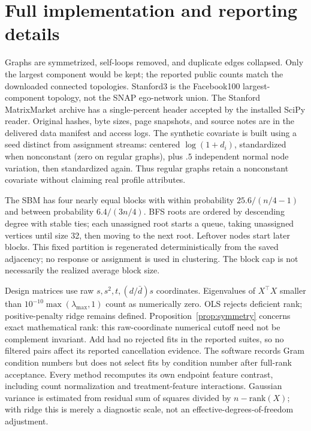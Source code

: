 \documentclass{article}
\begin{document}
\section{Full implementation and reporting details}\label{app:protocol}
\begin{table}[h]
\centering\small
\caption{Main graph statistics for seed 11 (synthetic) or the fixed public graph. Full per-seed manifests are delivered. Blocks are capped at 32 but may be smaller; edge cut is the fraction of edges crossing the partition.}\label{tab:graphs}

\end{table}

Graphs are symmetrized, self-loops removed, and duplicate edges collapsed. Only the largest component would be kept; the reported public counts match the downloaded connected topologies. Stanford3 is the Facebook100 largest-component topology, not the SNAP ego-network union. The Stanford MatrixMarket archive has a single-percent header accepted by the installed SciPy reader. Original hashes, byte sizes, page snapshots, and source notes are in the delivered data manifest and access logs. The synthetic covariate is built using a seed distinct from assignment streams: centered $\log(1+d_i)$, standardized when nonconstant (zero on regular graphs), plus $.5$ independent normal node variation, then standardized again. Thus regular graphs retain a nonconstant covariate without claiming real profile attributes.

The SBM has four nearly equal blocks with within probability $25.6/(n/4-1)$ and between probability $6.4/(3n/4)$. BFS roots are ordered by descending degree with stable ties; each unassigned root starts a queue, taking unassigned vertices until size 32, then moving to the next root. Leftover nodes start later blocks. This fixed partition is regenerated deterministically from the saved adjacency; no response or assignment is used in clustering. The block cap is not necessarily the realized average block size.

Design matrices use raw $s,s^2,t,(d/\bar d)s$ coordinates. Eigenvalues of $X^\top X$ smaller than $10^{-10}\max(\lambda_{\max},1)$ count as numerically zero. OLS rejects deficient rank; positive-penalty ridge remains defined. Proposition~\ref{prop:symmetry} concerns exact mathematical rank: this raw-coordinate numerical cutoff need not be complement invariant. Add had no rejected fits in the reported suites, so no filtered pairs affect its reported cancellation evidence. The software records Gram condition numbers but does not select fits by condition number after full-rank acceptance. Every method recomputes its own endpoint feature contrast, including count normalization and treatment-feature interactions. Gaussian variance is estimated from residual sum of squares divided by $n-\mathrm{rank}(X)$; with ridge this is merely a diagnostic scale, not an effective-degrees-of-freedom adjustment.
\end{document}
